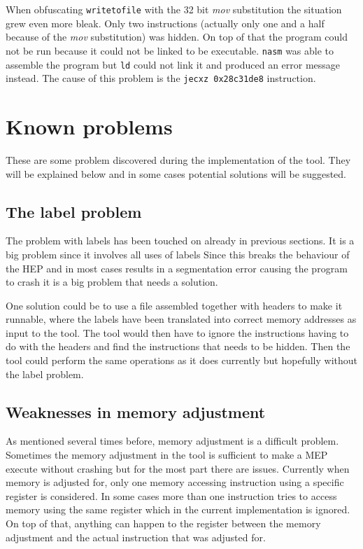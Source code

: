 \documentclass[11pt,twoside]{eitExjobb}
\begin{document}
When obfuscating \texttt{writetofile} with the 32 bit \emph{mov} substitution the situation grew even more bleak. Only two instructions (actually only one and a half because of the \emph{mov} substitution) was hidden. On top of that the program could not be run because it could not be linked to be executable. \texttt{nasm} was able to assemble the program but \texttt{ld}\cite{ld} could not link it and produced an error message instead. The cause of this problem is the \texttt{jecxz 0x28c31de8} instruction.

\section{Known problems}
These are some problem discovered during the implementation of the tool. They will be explained below and in some cases potential solutions will be suggested.

\subsection{The label problem}
The problem with labels has been touched on already in previous sections. It is a big problem since it involves all uses of labels Since this breaks the behaviour of the HEP and in most cases results in a segmentation error causing the program to crash it is a big problem that needs a solution. 

One solution could be to use a file assembled together with headers to make it runnable, where the labels have been translated into correct memory addresses as input to the tool. The tool would then have to ignore the instructions having to do with the headers and find the instructions that needs to be hidden. Then the tool could perform the same operations as it does currently but hopefully without the label problem. 



\subsection{Weaknesses in memory adjustment}
As mentioned several times before, memory adjustment is a difficult problem. Sometimes the memory adjustment in the tool is sufficient to make a MEP execute without crashing but for the most part there are issues. Currently when memory is adjusted for, only one memory accessing instruction using a specific register is considered. In some cases more than one instruction tries to access memory using the same register which in the current implementation is ignored. On top of that, anything can happen to the register between the memory adjustment and the actual instruction that was adjusted for. 
\end{document}
